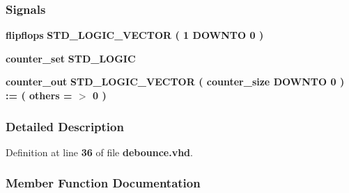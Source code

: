 \subsubsection*{Signals}
 \begin{DoxyCompactItemize}
\item 
{\bf flipflops} {\bfseries \textcolor{comment}{S\+T\+D\+\_\+\+L\+O\+G\+I\+C\+\_\+\+V\+E\+C\+T\+OR}\textcolor{vhdlchar}{ }\textcolor{vhdlchar}{(}\textcolor{vhdlchar}{ }\textcolor{vhdlchar}{ } \textcolor{vhdldigit}{1} \textcolor{vhdlchar}{ }\textcolor{keywordflow}{D\+O\+W\+N\+TO}\textcolor{vhdlchar}{ }\textcolor{vhdlchar}{ } \textcolor{vhdldigit}{0} \textcolor{vhdlchar}{ }\textcolor{vhdlchar}{)}\textcolor{vhdlchar}{ }} 
\item 
{\bf counter\+\_\+set} {\bfseries \textcolor{comment}{S\+T\+D\+\_\+\+L\+O\+G\+IC}\textcolor{vhdlchar}{ }} 
\item 
{\bf counter\+\_\+out} {\bfseries \textcolor{comment}{S\+T\+D\+\_\+\+L\+O\+G\+I\+C\+\_\+\+V\+E\+C\+T\+OR}\textcolor{vhdlchar}{ }\textcolor{vhdlchar}{(}\textcolor{vhdlchar}{ }\textcolor{vhdlchar}{ }\textcolor{vhdlchar}{ }\textcolor{vhdlchar}{ }{\bfseries {\bf counter\+\_\+size}} \textcolor{vhdlchar}{ }\textcolor{keywordflow}{D\+O\+W\+N\+TO}\textcolor{vhdlchar}{ }\textcolor{vhdlchar}{ } \textcolor{vhdldigit}{0} \textcolor{vhdlchar}{ }\textcolor{vhdlchar}{)}\textcolor{vhdlchar}{ }\textcolor{vhdlchar}{ }\textcolor{vhdlchar}{ }\textcolor{vhdlchar}{\+:}\textcolor{vhdlchar}{=}\textcolor{vhdlchar}{ }\textcolor{vhdlchar}{(}\textcolor{vhdlchar}{ }\textcolor{vhdlchar}{ }\textcolor{keywordflow}{others}\textcolor{vhdlchar}{ }\textcolor{vhdlchar}{ }\textcolor{vhdlchar}{=}\textcolor{vhdlchar}{ }\textcolor{vhdlchar}{$>$}\textcolor{vhdlchar}{ }\textcolor{vhdlchar}{\textquotesingle{}}\textcolor{vhdlchar}{ } \textcolor{vhdldigit}{0} \textcolor{vhdlchar}{ }\textcolor{vhdlchar}{\textquotesingle{}}\textcolor{vhdlchar}{ }\textcolor{vhdlchar}{)}\textcolor{vhdlchar}{ }} 
\end{DoxyCompactItemize}


\subsubsection{Detailed Description}


Definition at line {\bf 36} of file {\bf debounce.\+vhd}.



\subsubsection{Member Function Documentation}
